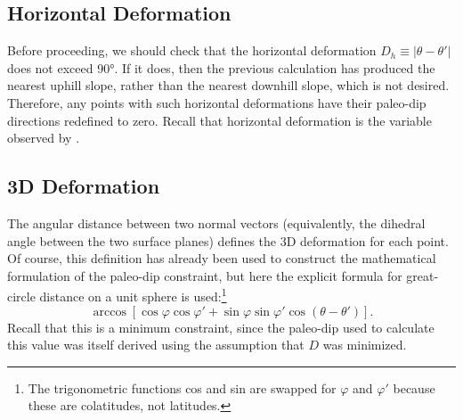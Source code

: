 \subsection{Horizontal Deformation}
Before proceeding, we should check that the horizontal deformation  $D_h \equiv |\theta-\theta'|$ does not exceed \ang{90}. If it does, then the previous calculation has produced the nearest uphill slope, rather than the nearest downhill slope, which is not desired. Therefore, any points with such horizontal deformations have their paleo-dip directions redefined to zero. Recall that horizontal deformation is the variable observed by \textcite{chadwick_late_2015,mouginis-mark_late-stage_2019}.
\subsection{3D Deformation}
The angular distance between two normal vectors (equivalently, the dihedral angle between the two surface planes) defines the 3D deformation for each point. Of course, this definition has already been used to construct the mathematical formulation of the paleo-dip constraint, but here the explicit formula for great-circle distance on a unit sphere is used:\footnote{The trigonometric functions cos and sin are swapped for $\varphi$ and $\varphi'$ because these are colatitudes, not latitudes.}
\begin{equation}
    \arccos\left[\cos\varphi\cos\varphi'+\sin\varphi\sin\varphi'\cos(\theta-\theta')\right].
\end{equation}
Recall that this is a minimum constraint, since the paleo-dip used to calculate this value was itself derived using the assumption that $D$ was minimized.